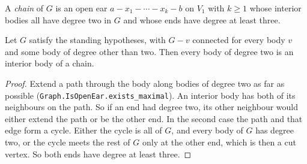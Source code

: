 \begin{definition}[Chains]
  \label{def:pencil-x0-chain}
  \leanok
  A \emph{chain} of $G$ is an open ear $a - x_1 - \cdots - x_k - b$ on
  $V_1$ with $k \ge 1$ whose interior bodies all have degree two in $G$
  and whose ends have degree at least three.
\end{definition}

\begin{lemma}
  \label{lem:pencil-x0-chain-exists}
  \leanok
  Let $G$ satisfy the standing hypotheses, with $G - v$ connected for
  every body $v$ and some body of degree other than two. Then every body
  of degree two is an interior body of a chain.
\end{lemma}
\begin{proof}
  \leanok
  Extend a path through the body along bodies of degree two as far as
  possible (\texttt{Graph.IsOpenEar.exists\_maximal}). An interior body
  has both of its neighbours on the path. So if an end had degree two,
  its other neighbour would either extend the path or be the other end.
  In the second case the path and that edge form a cycle. Either the
  cycle is all of $G$, and every body of $G$ has degree two, or the cycle
  meets the rest of $G$ only at the other end, which is then a cut
  vertex. So both ends have degree at least three.
\end{proof}

